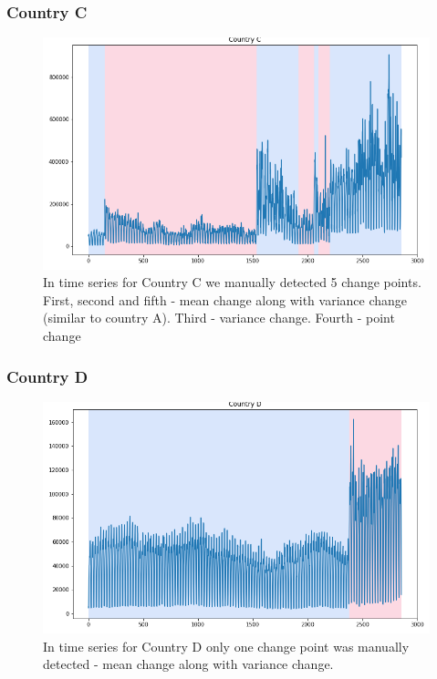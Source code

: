 \documentclass[intlimits, 9pt, unicode]{beamer}
\begin{document}
\begin{frame}
    \frametitle{Country C}
\begin{figure}
	\includegraphics[scale=0.30]{images/030_country_c}
	In time series for Country C we manually detected 5 change points. First, second and fifth - mean change along with variance change (similar to country A). Third - variance change. Fourth - point change
\end{figure}
\end{frame}

\begin{frame}
    \frametitle{Country D}
\begin{figure}
	\includegraphics[scale=0.30]{images/031_country_d}
	In time series for Country D only one change point was manually detected - mean change along with variance change.
\end{figure}
\end{frame}
\end{document}
